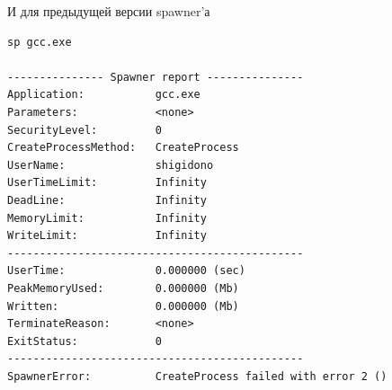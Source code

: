 \documentclass{imcs}
\begin{document}
И для предыдущей версии spawner’а
\begin{lstlisting}
sp gcc.exe

--------------- Spawner report ---------------
Application:           gcc.exe
Parameters:            <none>
SecurityLevel:         0
CreateProcessMethod:   CreateProcess
UserName:              shigidono
UserTimeLimit:         Infinity
DeadLine:              Infinity
MemoryLimit:           Infinity
WriteLimit:            Infinity
----------------------------------------------
UserTime:              0.000000 (sec)
PeakMemoryUsed:        0.000000 (Mb)
Written:               0.000000 (Mb)
TerminateReason:       <none>
ExitStatus:            0
----------------------------------------------
SpawnerError:          CreateProcess failed with error 2 ()
\end{lstlisting}
\end{document}
